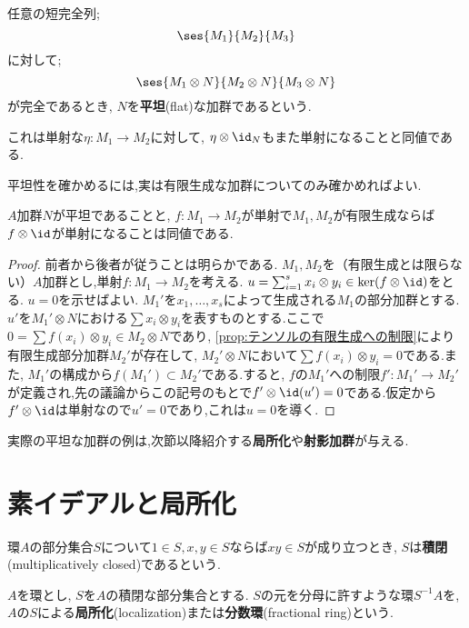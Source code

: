 \begin{defi}[平坦加群]
	任意の短完全列;
	\[\ses{M_1}{M_2}{M_3}\]
	に対して;
	\[\ses{M_1\otimes N}{M_2\otimes N}{M_3\otimes N}\]
	が完全であるとき, $N$を\textbf{平坦}(flat)な加群であるという.
\end{defi}

これは単射な$\eta:M_1\to M_2$に対して, $\eta\otimes\id_{N}$もまた単射になることと同値である.

平坦性を確かめるには,実は有限生成な加群についてのみ確かめればよい.

\begin{prop}\label{prop:平坦性は有限生成を調べれば良い}
	$A$加群$N$が平坦であることと, $f:M_1\to M_2$が単射で$M_1,M_2$が有限生成ならば$f\otimes\id$が単射になることは同値である.
\end{prop}

\begin{proof}
	前者から後者が従うことは明らかである. $M_1,M_2$を（有限生成とは限らない）$A$加群とし,単射$f:M_1\to M_2$を考える. $u=\sum_{i=1}^s x_i\otimes y_i\in\ker(f\otimes\id)$をとる. $u=0$を示せばよい. $M_1'$を$x_1,\dots,x_s$によって生成される$M_1$の部分加群とする. $u'$を$M_1'\otimes N$における$\sum x_i\otimes y_i$を表すものとする.ここで$0=\sum f(x_i)\otimes y_i\in M_2\otimes N$であり, \ref{prop:テンソルの有限生成への制限}により有限生成部分加群$M_2'$が存在して, $M_2'\otimes N$において$\sum f(x_i)\otimes y_i=0$である.また, $M_1'$の構成から$f(M_1')\subset M_2'$である.すると, $f$の$M_1'$への制限$f':M_1'\to M_2'$が定義され,先の議論からこの記号のもとで$f'\otimes\id(u')=0$である.仮定から$f'\otimes\id$は単射なので$u'=0$であり,これは$u=0$を導く.
\end{proof}

実際の平坦な加群の例は,次節以降紹介する\textbf{局所化}や\textbf{射影加群}が与える.

\section{素イデアルと局所化}

\begin{defi}[積閉集合]
	環$A$の部分集合$S$について$1\in S,x,y\in S$ならば$xy\in S$が成り立つとき, $S$は\textbf{積閉}(multiplicatively closed)であるという.
\end{defi}

\begin{defi}[局所化]
	$A$を環とし, $S$を$A$の積閉な部分集合とする. $S$の元を分母に許すような環$S^{-1}A$を, $A$の$S$による\textbf{局所化}(localization)または\textbf{分数環}(fractional ring)という.
\end{defi}

